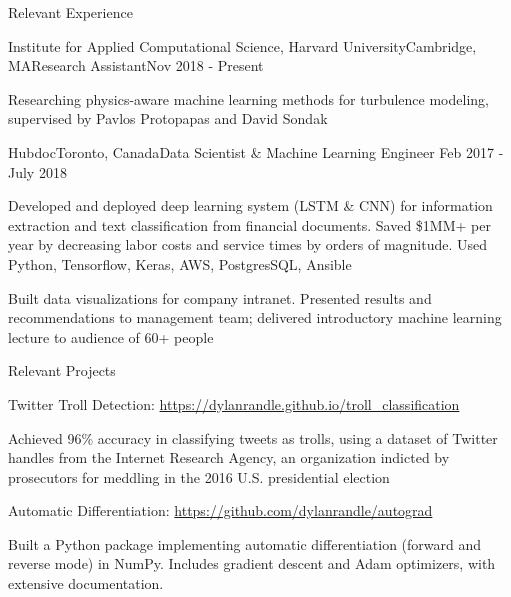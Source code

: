 \documentclass{resume} %
\begin{document}
\begin{rSection}{Relevant Experience}

\begin{rSubsection}{Institute for Applied Computational Science, Harvard University}{Cambridge, MA}{Research Assistant}{Nov 2018 - Present}
\item Researching physics-aware machine learning methods for turbulence modeling, supervised by Pavlos Protopapas and David Sondak
\end{rSubsection}


\begin{rSubsection}{Hubdoc}{Toronto, Canada}{Data Scientist \& Machine Learning Engineer}{ Feb 2017 - July 2018}
\item Developed and deployed deep learning system (LSTM \& CNN) for information extraction and text classification from financial documents. Saved \$1MM+ per year by decreasing labor costs and service times by orders of magnitude. Used Python, Tensorflow, Keras, AWS, PostgresSQL, Ansible
\item Built data visualizations for company intranet. Presented results and recommendations to management team; delivered introductory machine learning lecture to audience of 60+ people
\end{rSubsection}


\end{rSection}


\begin{rSection}{Relevant Projects}

\begin{rSubsection}{Twitter Troll Detection: \url{https://dylanrandle.github.io/troll_classification}}{}{}{}
\item Achieved 96\% accuracy in classifying tweets as trolls, using a dataset of Twitter handles from the Internet Research Agency, an organization indicted by prosecutors for meddling in the 2016 U.S. presidential election
\end{rSubsection}


\begin{rSubsection}{Automatic Differentiation: \url{https://github.com/dylanrandle/autograd }}{}{}{}
\item Built a Python package implementing automatic differentiation (forward and reverse mode) in NumPy. Includes gradient descent and Adam optimizers, with extensive documentation.
\end{rSubsection}

\end{rSection}
\end{document}
